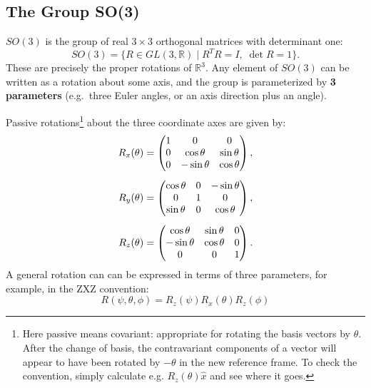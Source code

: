 \documentclass[12pt]{article}
\begin{document}
\subsection*{The Group SO(3)}

$SO(3)$ is the group of real $3\times 3$ orthogonal matrices
 with determinant one:
\begin{equation*}
  SO(3) = \bigl\{ R \in GL(3,\mathbb{R}) \mid R^T R = I,\; \det R = 1 \bigr\}.
\end{equation*}
These are precisely the proper rotations of $\mathbb{R}^3$.  Any
element of $SO(3)$ can be written as a rotation about some axis, and
the group is parameterized by \textbf{3 parameters} (e.g.\ three Euler
angles, or an axis direction plus an angle).

Passive rotations\footnote{Here passive means covariant: appropriate
for rotating the basis vectors by $\theta$.  After the change of
basis, the contravariant components of a vector will appear to have
been rotated by $-\theta$ in the new reference frame.  To check the
convention, simply calculate e.g. $R_z(\theta) \hat{x}$ and see where
it goes.} about the three coordinate axes are given by:
\begin{align}
  \label{eqn:so3-rotations}
  R_x(\theta) &= \begin{pmatrix} 1 & 0 & 0 \\ 0 & \cos\theta & \sin\theta \\ 0 & -\sin\theta & \cos\theta \end{pmatrix}, \notag \\[5pt]
  R_y(\theta) &= \begin{pmatrix} \cos\theta & 0 & -\sin\theta \\ 0 & 1 & 0 \\ \sin\theta & 0 & \cos\theta \end{pmatrix},  \\[5pt]
  R_z(\theta) &= \begin{pmatrix} \cos\theta & \sin\theta & 0 \\ -\sin\theta & \cos\theta & 0 \\ 0 & 0 & 1 \end{pmatrix}. \notag
\end{align}
A general rotation can can be expressed in terms of three parameters, for example, in the ZXZ convention:
\begin{equation}
 \label{eqn:rot-zxz}
 R(\psi,\theta,\phi) = R_z(\psi) R_x(\theta) R_z(\phi)
\end{equation}
\end{document}
